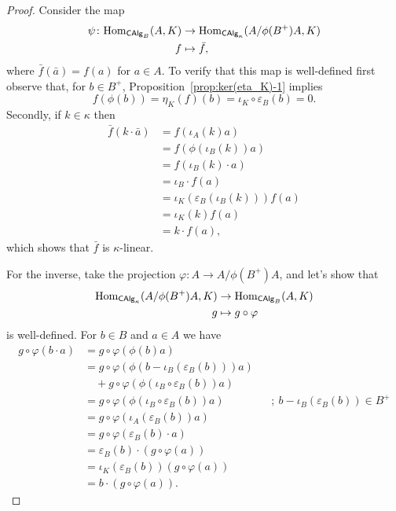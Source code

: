 \begin{proof}
    Consider the map
    \begin{align*}
        \psi\colon{\rm Hom}_{\mathsf{CAlg}_B}(A,K)&\to{\rm Hom}_{\mathsf{CAlg}_\kappa}(A/\phi(B^+)A,K)\\
        f&\mapsto \bar f,
    \end{align*}
    where $\bar f(\bar a)=f(a)$ for $a\in A$. To verify that this map is well-defined first observe that, for $b\in B^+$, Proposition~\ref{prop:ker(eta_K)-1} implies
    $$
        f(\phi(b)) = \eta_K(f)(b) = \iota_K\circ\varepsilon_B(b) = 0.
    $$
    Secondly, if $k\in\kappa$ then
    \begin{align*}
        \bar f(k\cdot\bar a) &= f(\iota_A(k)a)\\
            &= f(\phi(\iota_B(k))a)\\
            &= f(\iota_B(k)\cdot a)\\
            &= \iota_B\cdot f(a)\\
            &= \iota_K(\varepsilon_B(\iota_B(k)))f(a)\\
            &= \iota_K(k)f(a)\\
            &= k\cdot f(a),
    \end{align*}
    which shows that $\bar f$ is $\kappa$-linear.

    For the inverse, take the projection $\varphi\colon A\to A/\phi(B^+)A$, and let's show that
    \begin{align*}
        {\rm Hom}_{\mathsf{CAlg}_\kappa}(A/\phi(B^+)A,K)
            &\to{\rm Hom}_{\mathsf{CAlg}_B}(A,K)\\
        g&\mapsto g\circ\varphi
    \end{align*}
    is well-defined. For $b\in B$ and $a\in A$ we have
    \begin{align*}
        g\circ\varphi(b\cdot a) &= g\circ\varphi(\phi(b)a)\\
            &= g\circ\varphi(\phi(b-\iota_B(\varepsilon_B(b)))a)\\
            &\quad+ g\circ\varphi(\phi(\iota_B\circ\varepsilon_B(b))a)\\
            &= g\circ\varphi(\phi(\iota_B\circ\varepsilon_B(b))a)
                &&;\ b-\iota_B(\varepsilon_B(b))\in B^+\\
            &= g\circ\varphi(\iota_A(\varepsilon_B(b))a)\\
            &= g\circ\varphi(\varepsilon_B(b)\cdot a)\\
            &= \varepsilon_B(b)\cdot(g\circ\varphi(a))\\
            &= \iota_K(\varepsilon_B(b))(g\circ\varphi(a))\\
            &= b\cdot(g\circ\varphi(a)).
    \end{align*}
\end{proof}

